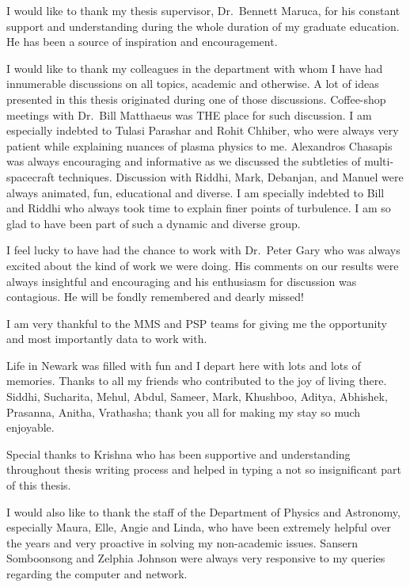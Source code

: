 %
%

I would like to thank my thesis supervisor, Dr.~Bennett Maruca, for his constant support and
understanding during the whole duration of my graduate education. He has been a source of
inspiration and encouragement.

I would like to thank my colleagues in the department with whom I have had innumerable discussions
on all topics, academic and otherwise. A lot of ideas presented in this thesis originated during one
of those discussions. Coffee-shop meetings with Dr.~Bill Matthaeus was THE place for such
discussion. I am especially indebted to Tulasi Parashar and Rohit Chhiber, who were always very
patient while explaining nuances of plasma physics to me. Alexandros Chasapis was always encouraging
and informative as we discussed the subtleties of multi-spacecraft techniques. Discussion with
Riddhi, Mark, Debanjan, and Manuel were always animated, fun, educational and diverse. I am
specially indebted to Bill and Riddhi who always took time to explain finer points of turbulence. I
am so glad to have been part of such a dynamic and diverse group.

I feel lucky to have had the chance to work with Dr.~Peter Gary who was always excited about the
kind of work we were doing. His comments on our results were always insightful and encouraging and
his enthusiasm for discussion was contagious. He will be fondly remembered and dearly missed!

I am very thankful to the MMS and PSP teams for giving me the opportunity and most importantly data
to work with.

Life in Newark was filled with fun and I depart here with lots and lots of memories. Thanks to all
my friends who contributed to the joy of living there. Siddhi, Sucharita, Mehul, Abdul, Sameer,
Mark, Khushboo, Aditya, Abhishek, Prasanna, Anitha, Vrathasha; thank you all for making my stay so
much enjoyable.

Special thanks to Krishna who has been supportive and understanding throughout thesis writing
process and helped in typing a not so insignificant part of this thesis.

I would also like to thank the staff of the Department of Physics and Astronomy, especially Maura,
Elle, Angie and Linda, who have been extremely helpful over the years and very proactive in solving
my non-academic issues. Sansern Somboonsong and Zelphia Johnson were always very responsive to my
queries regarding the computer and network.

